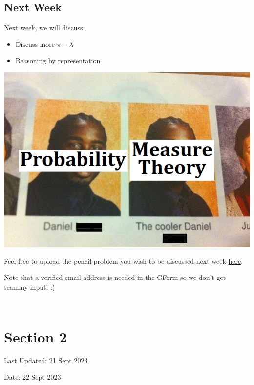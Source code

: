 \documentclass[
  letterpaper,
  DIV=11,
  numbers=noendperiod]{scrreprt}
\providecommand{\tightlist}{%
  \setlength{\itemsep}{0pt}\setlength{\parskip}{0pt}}\usepackage{longtable,booktabs,array}
\theoremstyle{plain}
\theoremstyle{definition}
\theoremstyle{remark}
\begin{document}
\hypertarget{next-week}{%
\section*{Next Week}\label{next-week}}


Next week, we will discuss:

\begin{itemize}
\tightlist
\item
  Discuss more \(\pi-\lambda\)
\item
  Reasoning by representation
\end{itemize}

\includegraphics{./assets/img/meme/meme1.png}

Feel free to upload the pencil problem you wish to be discussed next
week \href{https://forms.gle/RBmMNYJp4u3qD5W79}{here}.

Note that a verified email address is needed in the GForm so we don't
get scammy input! :)

\(\,\)


\hypertarget{section-2}{%
\chapter*{Section 2}\label{section-2}}


Last Updated: 21 Sept 2023

Date: 22 Sept 2023
\end{document}
